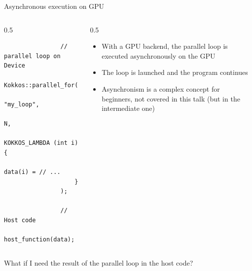 \documentclass[
    aspectratio=169,
    \createHandout
]{beamer}
\begin{document}

\begin{frame}[fragile]{Asynchronous execution on GPU}
    \begin{columns}
        \begin{column}{0.5\linewidth}
            \begin{verbatim}
                // parallel loop on Device
                Kokkos::parallel_for(
                    "my_loop",
                    N,
                    KOKKOS_LAMBDA (int i) {
                        data(i) = // ...
                    }
                );

                // Host code
                host_function(data);
            \end{verbatim}
        \end{column}
        \begin{column}{0.5\linewidth}
            \begin{itemize}
                \item With a GPU backend, the parallel loop is executed asynchronously on the GPU
                \item The loop is launched and the program continues
                \item Asynchronism is a complex concept for beginners, not covered in this talk (but in the intermediate one)
            \end{itemize}
        \end{column}
    \end{columns}

    \pause

    \vspace{1em}
     What if I need the result of the parallel loop in the host code?
\end{frame}

\end{document}
